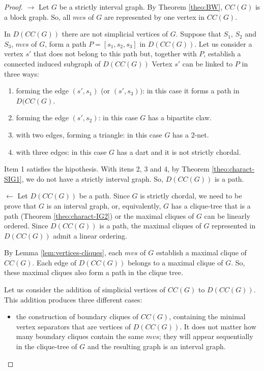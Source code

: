 \documentclass[preprint,12pt]{elsarticle}
\begin{document}
\begin{proof}
\bigskip
$\rightarrow$  
Let $G$ be a strictly interval graph.
By Theorem \ref{theo:BW}, $CC(G)$ is a block graph.
So, all $mvs$ of $G$ are represented by one vertex in $CC(G)$.

In $D(CC(G))$ there are not simplicial vertices of $G$.
Suppose that $S_1$, $S_2$ and $S_3$, $mvs$ of $G$, form a path $P=[s_1,s_2,s_3]$ in $D(CC(G))$.
Let us consider a vertex $s'$ that does not belong to this path but, together with $P$,
 establish a connected induced subgraph  of $D(CC(G))$ 
Vertex $s'$ can be linked to $P$ in three ways:

\begin{enumerate}
 \item forming the edge $(s',s_1)$  (or $(s',s_3))$: in this case it forms a path in $D(CC(G)$.
 \item forming the edge $(s',s_2)$: in this case $G$ has a bipartite claw.
 \item with two edges, forming a triangle: in this case $G$ has a 2-net.
 \item with three edges: in this case $G$ has a dart and it is not strictly chordal.
\end{enumerate}

Item 1 satisfies the hipothesis.
With itens 2, 3 and 4, by Theorem \ref{theo:charact-SIG1}, we do not have a strictly interval graph.
So, $D(CC(G))$ is a path.

\bigskip

$\leftarrow$
Let $D(CC(G))$ be a path. 
Since $G$ is strictly chordal, we need to be prove that $G$ is an interval graph, 
or, equivalently,  $G$ has a clique-tree that is a path (Theorem \ref{theo:charact-IG2})
 or the maximal cliques of $G$ can be linearly ordered. 
Since $D(CC(G))$ is a path, the maximal cliques of $G$ represented in $D(CC(G))$  admit a linear ordering. 

By Lemma \ref{lem:vertices-cliques}, each $mvs$ of $G$ establish a maximal clique of $CC(G)$.
Each edge of $D(CC(G))$ belongs to a maximal clique of $G$.
So, these maximal cliques also form a path in the clique tree.
 
Let us consider the addition of simplicial vertices of $CC(G)$ to $D(CC(G))$. 
This addition produces three different cases:

\begin{itemize}
\item[i] the construction of boundary cliques of $CC(G)$, 
containing the minimal vertex separators that are vertices of $D(CC(G))$.
It does not matter how many boundary cliques contain the same $mvs$;
 they will appear sequentially   in the clique-tree of $G$ and the resulting graph  is an interval graph.


\end{itemize}
\end{proof}
\end{document}
